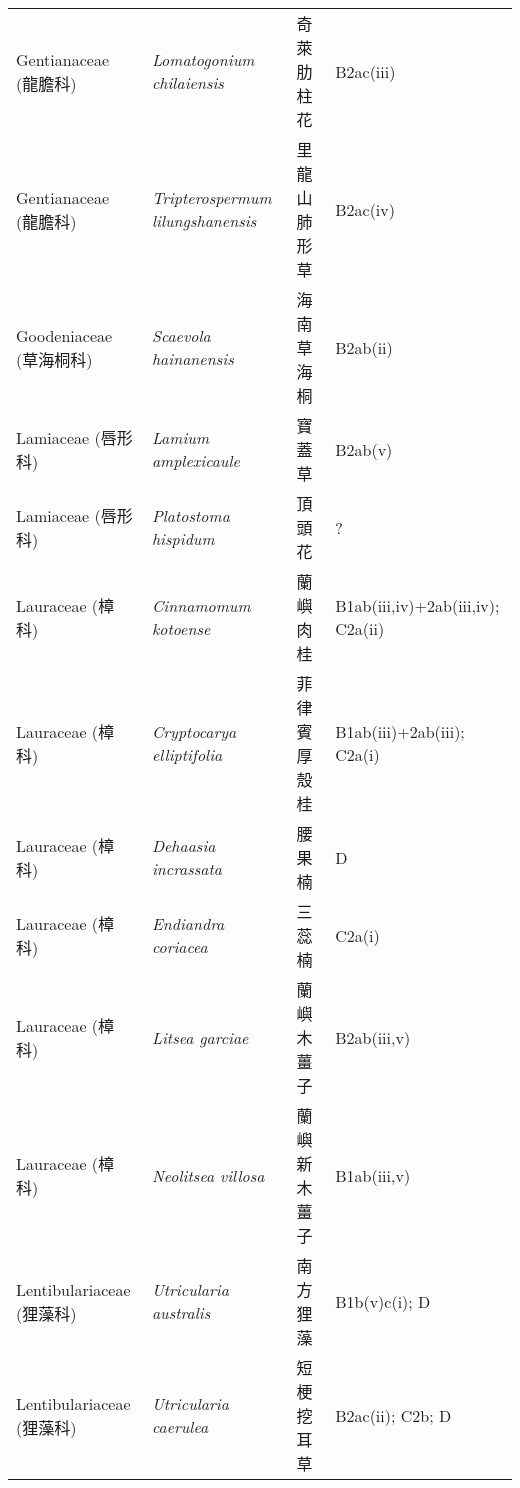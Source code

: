 \begin{longtable}{p{3cm}p{5cm}p{3cm}p{4cm}}
    Gentianaceae (龍膽科) & \textit{Lomatogonium chilaiensis}  & 奇萊肋柱花 & B2ac(iii) \index{Lomatogonium@\textit{Lomatogonium}!chilaiensis@\textit{chilaiensis}}  \index{奇萊肋柱花} \\
    Gentianaceae (龍膽科) & \textit{Tripterospermum lilungshanensis}  & 里龍山肺形草 & B2ac(iv) \index{Tripterospermum@\textit{Tripterospermum}!lilungshanensis@\textit{lilungshanensis}}  \index{里龍山肺形草} \\
    Goodeniaceae (草海桐科) & \textit{Scaevola hainanensis}  & 海南草海桐 & B2ab(ii) \index{Scaevola@\textit{Scaevola}!hainanensis@\textit{hainanensis}}  \index{海南草海桐} \\
    Lamiaceae (唇形科) & \textit{Lamium amplexicaule}  & 寶蓋草 & B2ab(v) \index{Lamium@\textit{Lamium}!amplexicaule@\textit{amplexicaule}}  \index{寶蓋草} \\
    Lamiaceae (唇形科) & \textit{Platostoma hispidum}  & 頂頭花 & ? \index{Platostoma@\textit{Platostoma}!hispidum@\textit{hispidum}}  \index{頂頭花} \\
    Lauraceae (樟科) & \textit{Cinnamomum kotoense}  & 蘭嶼肉桂 & B1ab(iii,iv)+2ab(iii,iv); C2a(ii) \index{Cinnamomum@\textit{Cinnamomum}!kotoense@\textit{kotoense}}  \index{蘭嶼肉桂} \\
    Lauraceae (樟科) & \textit{Cryptocarya elliptifolia}  & 菲律賓厚殼桂 & B1ab(iii)+2ab(iii); C2a(i) \index{Cryptocarya@\textit{Cryptocarya}!elliptifolia@\textit{elliptifolia}}  \index{菲律賓厚殼桂} \\
    Lauraceae (樟科) & \textit{Dehaasia incrassata}  & 腰果楠 & D \index{Dehaasia@\textit{Dehaasia}!incrassata@\textit{incrassata}}  \index{腰果楠} \\
    Lauraceae (樟科) & \textit{Endiandra coriacea}  & 三蕊楠 & C2a(i) \index{Endiandra@\textit{Endiandra}!coriacea@\textit{coriacea}}  \index{三蕊楠} \\
    Lauraceae (樟科) & \textit{Litsea garciae}  & 蘭嶼木薑子 & B2ab(iii,v) \index{Litsea@\textit{Litsea}!garciae@\textit{garciae}}  \index{蘭嶼木薑子} \\
    Lauraceae (樟科) & \textit{Neolitsea villosa}  & 蘭嶼新木薑子 & B1ab(iii,v) \index{Neolitsea@\textit{Neolitsea}!villosa@\textit{villosa}}  \index{蘭嶼新木薑子} \\
    Lentibulariaceae (狸藻科) & \textit{Utricularia australis}  & 南方狸藻 & B1b(v)c(i); D \index{Utricularia@\textit{Utricularia}!australis@\textit{australis}}  \index{南方狸藻} \\
    Lentibulariaceae (狸藻科) & \textit{Utricularia caerulea}  & 短梗挖耳草 & B2ac(ii); C2b; D \index{Utricularia@\textit{Utricularia}!caerulea@\textit{caerulea}}  \index{短梗挖耳草} \\

\end{longtable}
